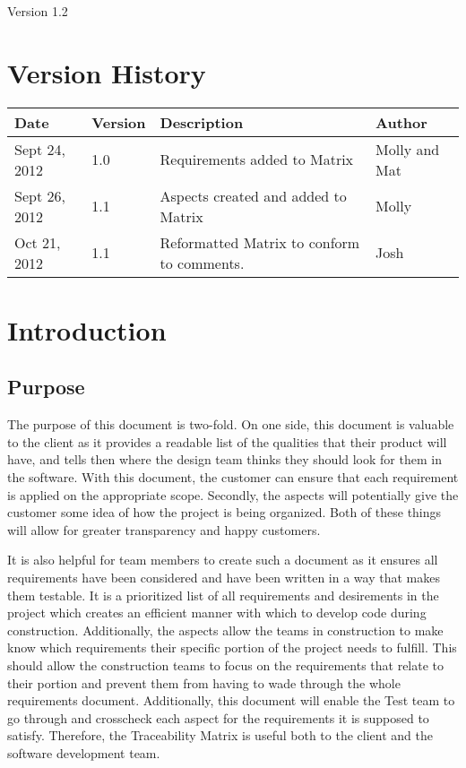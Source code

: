 \documentclass{article}
\title{\Title}
\author{\Author}
\date{\today}
\def\TMVersion{1.2}
\def\Version{\TMVersion}
\newcounter{Requirement}
\newcounter{Aspect}
\newcommand{\setupintro}{
\renewcommand{\thepage}{}
\maketitle
\begin{center}
\large Version \Version \normalsize
\end{center}
\newpage
\setcounter{page}{1}
\renewcommand{\thepage}{\roman{page}}
\tableofcontents 
\newpage
\setcounter{page}{1}
\renewcommand{\thepage}{\arabic{page}}
}
\begin{document}
\raggedright
\setupintro



\section{Version History}
\begin{tabular}{|l|l|p{3.25in}|l|}
\hline
Date & Version & Description & Author \\\hline
Sept 24, 2012 & 1.0 & Requirements added to Matrix & Molly and Mat\\\hline
Sept 26, 2012 & 1.1 & Aspects created and added to Matrix& Molly\\\hline
Oct 21, 2012 & 1.1 & Reformatted Matrix to conform to comments. & Josh\\\hline
\end{tabular}

\section{Introduction}

\subsection{Purpose}

The purpose of this document is two-fold.  On one side, this document is valuable to the client as it provides a readable list of the qualities that their product will have, and tells then where the design team thinks they should look for them in the software.  With this document, the customer can ensure that each requirement is applied on the appropriate scope.  Secondly, the aspects will potentially give the customer some idea of how the project is being organized.  Both of these things will allow for greater transparency and happy customers.

\bigskip

It is also helpful for team members to create such a document as it ensures all requirements have been considered and have been written in a way that makes them testable.  It is a prioritized list of all requirements and desirements in the project which creates an efficient manner with which to develop code during construction.  Additionally, the aspects allow the teams in construction to make know which requirements their specific portion of the project needs to fulfill.  This should allow the construction teams to focus on the requirements that relate to their portion and prevent them from having to wade through the whole requirements document.  Additionally, this document will enable the Test team to go through and crosscheck each aspect for the requirements it is supposed to satisfy.  Therefore, the Traceability Matrix is useful both to the client and the software development team.
\end{document}
